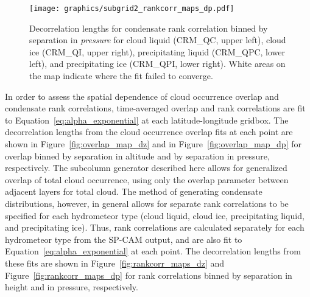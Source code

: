 \begin{figure}[htbp]
\centering
\texttt{[image: graphics/subgrid2\_rankcorr\_maps\_dp.pdf]}
\caption{\label{fig:rankcorr_maps_dp}Decorrelation lengths for
condensate rank correlation binned by separation in \emph{pressure} for
cloud liquid (CRM\_QC, upper left), cloud ice (CRM\_QI, upper right),
precipitating liquid (CRM\_QPC, lower left), and precipitating ice
(CRM\_QPI, lower right). White areas on the map indicate where the fit
failed to converge.}\label{fig:rankcorrux5fmapsux5fdp}
\end{figure}

In order to assess the spatial dependence of cloud occurrence overlap
and condensate rank correlations, time-averaged overlap and rank
correlations are fit to Equation~\ref{eq:alpha_exponential} at each
latitude-longitude gridbox. The decorrelation lengths from the cloud
occurrence overlap fits at each point are shown in
Figure~\ref{fig:overlap_map_dz} and in Figure~\ref{fig:overlap_map_dp}
for overlap binned by separation in altitude and by separation in
pressure, respectively. The subcolumn generator described here allows
for generalized overlap of total cloud occurrence, using only the
overlap parameter between adjacent layers for total cloud. The method of
generating condensate distributions, however, in general allows for
separate rank correlations to be specified for each hydrometeor type
(cloud liquid, cloud ice, precipitating liquid, and precipitating ice).
Thus, rank correlations are calculated separately for each hydrometeor
type from the SP-CAM output, and are also fit to
Equation~\ref{eq:alpha_exponential} at each point. The decorrelation
lengths from these fits are shown in Figure~\ref{fig:rankcorr_maps_dz}
and Figure~\ref{fig:rankcorr_maps_dp} for rank correlations binned by
separation in height and in pressure, respectively.

